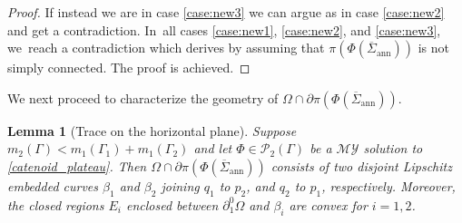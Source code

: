 \documentclass[JEP,XML,SOM,Unicode, NoFloatCountersInSection,published]{cedram}
\let\Om\Omega
\newcommand{\immclosedann}{\Phi({\overline\Sigma}_\mathrm{ann})}
\newtheorem{lemma}[theorem]{Lemma}
\theoremstyle{definition}
\begin{document}
\begin{proof}
If instead we are in case \ref{case:new3} we can argue as in case \ref{case:new2} and get a contradiction. In~all cases \ref{case:new1}, \ref{case:new2}, and \ref{case:new3}, we~reach a contradiction which derives by assuming that $\pi(\immclosedann)$ is not simply connected. The proof is achieved.
\end{proof}

We next proceed to characterize the geometry of $\Om\cap\partial
\pi(\immclosedann)$.

\begin{lemma}[Trace on the horizontal plane]
\label{lem:trace_on_the_horizontal_plane}
Suppose $m_2(\Gamma)<m_1(\Gamma_1)+m_1(\Gamma_2)$ and let
$\Phi\in\mathcal{P}_2(\Gamma)$ be a $\mathcal{MY}$ solution to \eqref{catenoid_plateau}.
Then $\Om\cap\partial \pi(\immclosedann)$
consists of two disjoint Lipschitz
embedded curves $\beta_1$ and $\beta_2$ joining $q_1$ to $p_2$, and $q_2$ to $p_1$, respectively.
Moreover, the closed regions $E_i$
enclosed between $\partial^0_1\Om$ and $\beta_i$
are convex for $i=1,2$.
\end{lemma}
\end{document}
